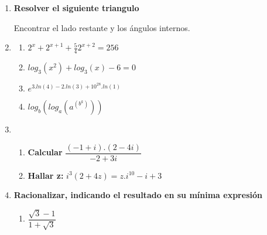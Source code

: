 \documentclass[a4paper,12pt]{exam}
\begin{document}
\begin{enumerate}
\item \textbf{Resolver el siguiente triangulo}



Encontrar el lado restante y los ángulos internos.

\item \begin{multicols}{2}
\begin{enumerate}
\item $2^x+2^{x+1}+\frac{5}{4}2^{x+2}=256$
\item $log_3(x^2)+log_3(x)-6=0$

\columnbreak

\item $e^{3.ln(4)-2.ln(3)+10^{28}.ln(1)}$
\item $log_b(log_a(a^{(b^k)}))$

\end{enumerate}
\end{multicols}

\item 
\begin{enumerate}

\item \textbf{Calcular}
$\dfrac{(-1+i).(2-4i)}{-2+3i}$
\item \textbf{Hallar z:}
$i^{3}(2+4z)=z.i^{10}-i+3$
\end{enumerate}


\item \textbf{Racionalizar, indicando el resultado en su mínima expresión}
\begin{enumerate}
\item $ \dfrac{\sqrt{3}-1}{1+\sqrt{3}} $


\end{enumerate}
\end{enumerate}
\end{document}
